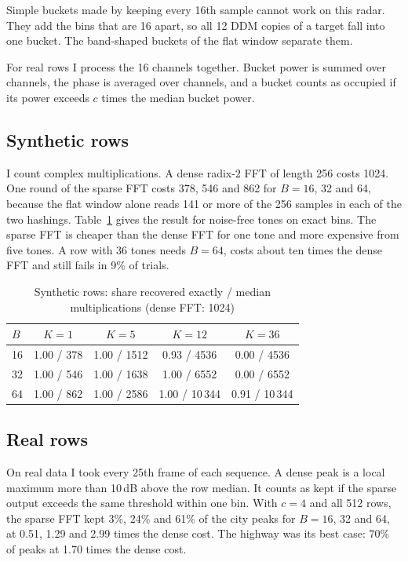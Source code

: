\documentclass[conference]{IEEEtran}
\begin{document}
Simple buckets made by keeping every 16th sample cannot work on this radar. They add the bins that are 16 apart, so all 12 DDM copies of a target fall into one bucket. The band-shaped buckets of the flat window separate them.

For real rows I process the 16 channels together. Bucket power is summed over channels, the phase is averaged over channels, and a bucket counts as occupied if its power exceeds $c$ times the median bucket power.

\subsection{Synthetic rows}
I count complex multiplications. A dense radix-2 FFT of length 256 costs 1024. One round of the sparse FFT costs 378, 546 and 862 for $B = 16$, 32 and 64, because the flat window alone reads 141 or more of the 256 samples in each of the two hashings. Table~\ref{tab:syn} gives the result for noise-free tones on exact bins. The sparse FFT is cheaper than the dense FFT for one tone and more expensive from five tones. A row with 36 tones needs $B = 64$, costs about ten times the dense FFT and still fails in 9\% of trials.

\begin{table}[t]
\caption{Synthetic rows: share recovered exactly / median multiplications (dense FFT: 1024)}
\label{tab:syn}
\centering
\begin{tabular}{lcccc}
\toprule
$B$ & $K = 1$ & $K = 5$ & $K = 12$ & $K = 36$ \\
\midrule
16 & 1.00 / 378 & 1.00 / 1512 & 0.93 / 4536 & 0.00 / 4536 \\
32 & 1.00 / 546 & 1.00 / 1638 & 1.00 / 6552 & 0.00 / 6552 \\
64 & 1.00 / 862 & 1.00 / 2586 & 1.00 / 10\,344 & 0.91 / 10\,344 \\
\bottomrule
\end{tabular}
\end{table}

\subsection{Real rows}

On real data I took every 25th frame of each sequence. A dense peak is a local maximum more than 10\,dB above the row median. It counts as kept if the sparse output exceeds the same threshold within one bin. With $c = 4$ and all 512 rows, the sparse FFT kept 3\%, 24\% and 61\% of the city peaks for $B = 16$, 32 and 64, at 0.51, 1.29 and 2.99 times the dense cost. The highway was its best case: 70\% of peaks at 1.70 times the dense cost.
\end{document}
